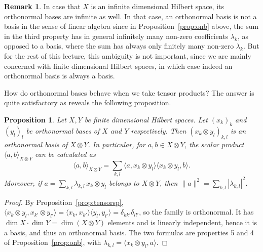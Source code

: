 \documentclass[11pt,a4paper]{article}
\numberwithin{equation}{section}
\newcommand{\ip}[2]{\langle #1, #2\rangle}
\theoremstyle{plain}
\newtheorem{proposition}[theorem]{Proposition}
\theoremstyle{definition}
\newtheorem{remark}[theorem]{Remark}
\theoremstyle{plain}
\theoremstyle{definition}
\begin{document}
\begin{remark}
In case that $X$ is an infinite dimensional Hilbert space, its orthonormal bases are
infinite as well. In that case, an orthonormal basis is not a basis in the sense of linear
algebra since in Proposition~\ref{prop:onb} above, the sum in the third property has in
general infinitely many non-zero coefficients $\lambda_k$, as opposed to a basis, where the
sum has always only finitely many non-zero $\lambda_k$. But for the rest of this lecture,
this ambiguity is not important, since we are mainly concerned with finite dimensional
Hilbert spaces, in which case indeed an orthonormal basis is always a basis.
\end{remark}

How do orthonormal bases behave when we take tensor products? The answer is quite
satisfactory as reveals the following proposition.

\begin{proposition}\label{prop:tensoronb}
Let $X,Y$ be finite dimensional Hilbert spaces. Let $(x_k)_k$ and $(y_l)_l$ be orthonormal
bases of $X$ and $Y$ respectively. Then $(x_k\otimes y_l)_{k,l}$ is an orthonormal basis of
$X\otimes Y$. In particular, for $a,b\in X\otimes Y$, the scalar product
$\ip{a}{b}_{X\otimes Y}$ can be calculated as
\[
\ip{a}{b}_{X\otimes Y}=\sum_{k,l}\ip{a}{x_k\otimes y_l}\ip{x_k\otimes y_l}{b} .
\]
Moreover, if $a=\sum_{k,l}\lambda_{k,l}\,x_k\otimes y_l$ belongs to $X\otimes Y$, then
$\|a\|^2=\sum_{k,l}|\lambda_{k,l}|^2$.
\end{proposition}
\begin{proof}
By Proposition~\ref{prop:tensorsp},
$\ip{x_k\otimes y_l}{x_{k'}\otimes y_{l'}}=\ip{x_k}{x_{k'}}\ip{y_l}{y_{l'}}=\delta_{kk'}\delta_{ll'}$,
so the family is orthonormal. It has $\dim X\cdot\dim Y=\dim(X\otimes Y)$ elements and is
linearly independent, hence it is a basis, and thus an orthonormal basis. The two formulas
are properties 5 and 4 of Proposition~\ref{prop:onb}, with
$\lambda_{k,l}=\ip{x_k\otimes y_l}{a}$.
\end{proof}
\end{document}
